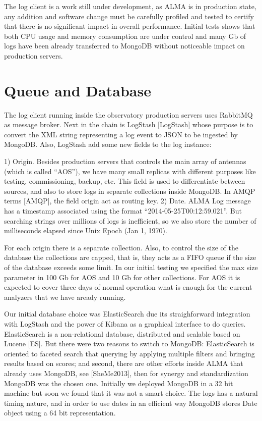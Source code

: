\documentclass[]{spie}  %
\begin{document}
The log client is a work still under development, as ALMA is in production
state, any addition and software change must be carefully profiled and tested
to certify that there is no significant impact in overall performance. Initial
tests shows that both CPU usage and memory consumption are under control and
many Gb of logs have been already transferred to MongoDB without noticeable
impact on production servers.

\section{Queue and Database}
The log client running inside the observatory production servers uses RabbitMQ
as message broker. Next in the chain is LogStash [LogStash] whose purpose is to
convert the XML string representing a log event to JSON to be ingested by
MongoDB. Also, LogStash add some new fields to the log instance:

1)  Origin. Besides production servers that controls the main array of antennas
(which is called “AOS”), we have many small replicas with different
purposes like testing, commissioning, backup, etc. This field is used to
differentiate between sources, and also to store logs in separate collections
inside MongoDB. In AMQP terms [AMQP], the field origin act as routing key.  2)
Date. ALMA Log message has a timestamp associated using the format
“2014-05-25T00:12:59.021”. But searching strings over millions of logs
is inefficient, so we also store the number of milliseconds elapsed since Unix
Epoch (Jan 1, 1970).

For each origin there is a separate collection. Also, to control the size of
the database the collections are capped, that is, they acts as a FIFO queue if
the size of the database exceeds some limit. In our initial testing we
specified the max size parameter in 100 Gb for AOS and 10 Gb for other
collections. For AOS it is expected to cover three days of normal operation
what is enough for the current analyzers that we have aready running.

Our initial database choice was ElasticSearch due its straighforward
integration with LogStash and the power of Kibana as a graphical interface to
do queries. ElasticSearch is a non-relational database, distributed and
scalable based on Lucene [ES]. But there were two reasons to switch to MongoDB:
ElasticSearch is oriented to faceted search that querying by applying multiple
filters and bringing results based on scores; and second, there are other
efforts inside ALMA that already uses MongoDB, see [SheMe2013], then for
synergy and standardization MongoDB was the chosen one. Initially we deployed
MongoDB in a 32 bit machine but soon we found that it was not a smart choice.
The logs has a natural timing nature, and in order to use dates in an efficient
way MongoDB stores Date object using a  64 bit  representation.
\end{document}
